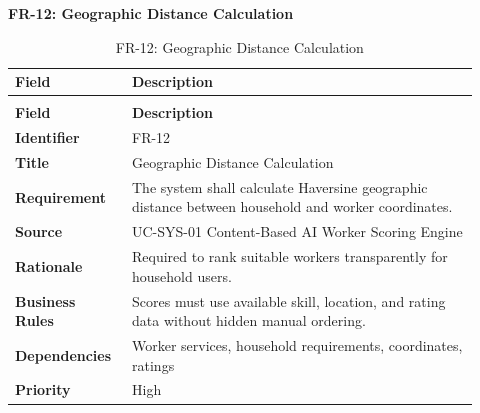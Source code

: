 \documentclass[12pt,a4paper]{article}
\begin{document}
\noindent\textbf{FR-12: Geographic Distance Calculation}\par
\vspace{4pt}
\begingroup\small\setlength{\tabcolsep}{4pt}\renewcommand{\arraystretch}{1.15}
\begin{longtable}{|>{\raggedright\arraybackslash}p{0.22\linewidth}|>{\raggedright\arraybackslash}p{0.70\linewidth}|}
\caption{FR-12: Geographic Distance Calculation}\label{tab:fr-12}\\
\hline
\textbf{Field} & \textbf{Description} \\ \hline
\endfirsthead
\multicolumn{2}{c}{Table \thetable\ Geographic Distance Calculation (continued)}\\
\hline
\textbf{Field} & \textbf{Description} \\ \hline
\endhead
\textbf{Identifier} & FR-12 \\ \hline
\textbf{Title} & Geographic Distance Calculation \\ \hline
\textbf{Requirement} & The system shall calculate Haversine geographic distance between household and worker coordinates. \\ \hline
\textbf{Source} & UC-SYS-01 Content-Based AI Worker Scoring Engine \\ \hline
\textbf{Rationale} & Required to rank suitable workers transparently for household users. \\ \hline
\textbf{Business Rules} & Scores must use available skill, location, and rating data without hidden manual ordering. \\ \hline
\textbf{Dependencies} & Worker services, household requirements, coordinates, ratings \\ \hline
\textbf{Priority} & High \\ \hline
\end{longtable}
\endgroup
\clearpage
\end{document}
